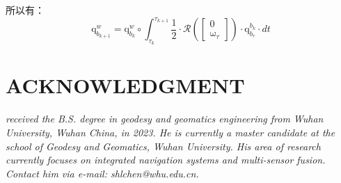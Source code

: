 \documentclass[12pt, onecolumn]{article}
\newcommand\bsm[1]{\boldsymbol{\mathrm{#1}}}
\newcommand\quaternion[2]{{\bsm{q}_{#1}^{#2}}}
\begin{document}
		所以有：
		\begin{equation}
		\quaternion{b_{k+1}}{w}=\quaternion{b_k}{w}\circ
					 \int_{\tau_{k}}^{\tau_{k+1}}\frac{1}{2}\cdot\mathcal{R}\left( \begin{bmatrix}
					 		0\\
					 		\bsm{\omega}_\tau
					 		\end{bmatrix}\right) \cdot\quaternion{b_\tau}{b_k}\cdot dt
		\end{equation}
	
	\newpage
	
	
		
	\newpage
	\section*{ACKNOWLEDGMENT}
	\begin{tcolorbox}[colback=white,colframe=white!70!black,title={\bfseries Author Information}]
	\par\noindent
		\parbox[t]{\linewidth}{
	 \noindent{}
	 \emph{
	 received the B.S. degree in geodesy and geomatics engineering from Wuhan University, Wuhan China, in 2023.
	 He is currently a master candidate at the school of Geodesy and Geomatics, Wuhan University. His area of research currently focuses on integrated navigation systems and multi-sensor fusion.
	 Contact him via e-mail: shlchen@whu.edu.cn.
	 }}
	\end{tcolorbox}
		
		
\end{document}
